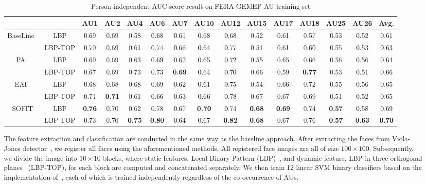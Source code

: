 \documentclass[10pt,journal]{IEEEtran}
\begin{document}
\begin{table}[htbp]
\caption{Person-independent AUC-score result on FERA-GEMEP AU training set}
\begin{center}
\label{table:fera}
\begin{tabular}{ccccccccccccccc}
\toprule
& & AU1 & AU2 & AU4 & AU6 & AU7 & AU10 & AU12 & AU15 & AU17 & AU18 & AU25 & AU26 & Avg.	\\ 
\midrule
\multirow{2}{*}{BaseLine~\cite{Valstar_FERA11}}	& LBP 		&0.69	&0.69	&0.58	&0.68	&0.61	&0.68	&0.68	&0.52	&0.61	&0.57	&0.53	&0.52	&0.61 \\
																								& LBP-TOP &0.70	&0.69	&0.61	&0.74	&0.66	&0.64	&0.77	&0.51	&0.61	&0.60	&0.55	&0.53	&0.63 \\
																								\midrule
\multirow{2}{*}{PA~\cite{Tadas_ECCV14}}					& LBP 		&0.69	&0.69	&0.63	&0.69	&0.62	&0.65	&0.72	&0.55	&0.65	&0.66	&0.56	&0.56	&0.64 \\
																								& LBP-TOP &0.67	&0.69	&0.73	&0.73	&\textbf{0.69}\cellcolor[gray]{0.9}	&0.64	&0.70	&0.66	&0.59	&\textbf{0.77}\cellcolor[gray]{0.9}	&0.53	&0.51	&0.66 \\
																								\midrule
\multirow{2}{*}{EAI~\cite{Yang_SMCB12}}					& LBP 		&0.68	&0.68	&0.68	&0.69	&0.62	&0.61	&0.75	&0.54	&0.66	&0.72	&0.55	&0.56	&0.65 \\
																								& LBP-TOP &0.71	&\textbf{0.71}\cellcolor[gray]{0.9}	&0.61	&0.66	&0.63	&0.66	&0.78	&0.67	&0.67	&0.69	&0.51	&0.52	&0.65 \\
																								\midrule				
\multirow{2}{*}{SOFIT}													& LBP 		&\textbf{0.76}\cellcolor[gray]{0.9}	&0.70	&0.62	&0.78	&0.67	&\textbf{0.70}\cellcolor[gray]{0.9}	&0.74	&\textbf{0.68}\cellcolor[gray]{0.9}	&\textbf{0.69}\cellcolor[gray]{0.9}	&0.74	&\textbf{0.57}\cellcolor[gray]{0.9}	&0.58	&0.69 \\
																								& LBP-TOP &0.73	&0.70	&\textbf{0.75}\cellcolor[gray]{0.9}	&\textbf{0.80}\cellcolor[gray]{0.9}	&0.64	&0.67	&\textbf{0.82}\cellcolor[gray]{0.9}	&\textbf{0.68}\cellcolor[gray]{0.9}	&0.67	&0.76 &\textbf{0.57}\cellcolor[gray]{0.9}	&\textbf{0.63}\cellcolor[gray]{0.9}	&\textbf{0.70}\cellcolor[gray]{0.9} \\
\bottomrule
\end{tabular}
\end{center}
\end{table}


The feature extraction and classification are conducted in the same way as the baseline approach. After extracting the faces from Viola-Jones detector~\cite{Viola_IJCV04}, we register all faces using the aforementioned methods. All registered face images are all of size $100\times100$. Subsequently, we divide the image into $10\times10$ blocks, where static features, Local Binary Pattern (LBP)~\cite{Ojala_PAMI02}, and dynamic feature, LBP in three orthogonal planes~\cite{Zhao_PAMI07} (LBP-TOP), for each block are computed and concatenated separately. We then train $12$ linear SVM binary classifiers based on the implementation of~\cite{SVMlib}, each of which is trained independently regardless of the co-occurrence of AUs.
\end{document}
